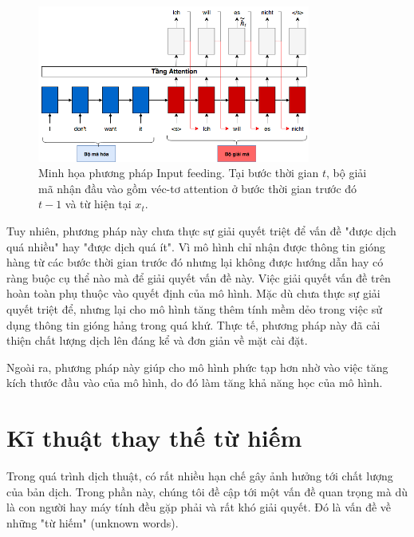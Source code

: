 \begin{figure}
	\centering
	\includegraphics[width=0.8\textwidth]{Input-feeding_2.png}
	\caption[Minh họa cơ chế Attention Cục bộ.]{Minh họa phương pháp Input feeding. Tại bước thời gian $t$, bộ giải mã nhận đầu vào gồm véc-tơ attention ở bước thời gian trước đó $t-1$ và từ hiện tại $x_t$.}
	\label{fig_Input_feeding}
\end{figure}
Tuy nhiên, phương pháp này chưa thực sự giải quyết triệt để vấn đề "được dịch quá nhiều" hay "được dịch quá ít". Vì mô hình chỉ nhận được thông tin gióng hàng từ các bước thời gian trước đó nhưng lại không được hướng dẫn hay có ràng buộc cụ thể nào mà để giải quyết vấn đề này. Việc giải quyết vấn đề trên hoàn toàn phụ thuộc vào quyết định của mô hình. Mặc dù chưa thực sự giải quyết triệt để, nhưng lại cho mô hình tăng thêm tính mềm dẻo trong việc sử dụng thông tin gióng hảng trong quá khứ. Thực tế, phương pháp này đã cải thiện chất lượng dịch lên đáng kể và đơn giản về mặt cài đặt.

Ngoài ra, phương pháp này giúp cho mô hình phức tạp hơn nhờ vào việc tăng kích thước đầu vào của mô hình, do đó làm tăng khả năng học của mô hình.

\section{Kĩ thuật thay thế từ hiếm}
Trong quá trình dịch thuật, có rất nhiều hạn chế gây ảnh hưởng tới chất lượng của bản dịch. Trong phần này, chúng tôi đề cập tới một vấn đề quan trọng mà dù là con người hay máy tính đều gặp phải và rất khó giải quyết. Đó là vấn đề về những "từ hiếm" (unknown words). 

